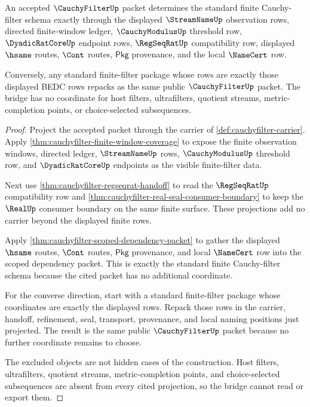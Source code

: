 \begin{theorem}
\label{thm:cauchyfilter-finite-filter-standard-bridge}
An accepted $\CauchyFilterUp$ packet determines the standard finite
Cauchy-filter schema exactly through the displayed $\StreamNameUp$ observation
rows, directed finite-window ledger, $\CauchyModulusUp$ threshold row,
$\DyadicRatCoreUp$ endpoint rows, $\RegSeqRatUp$ compatibility row, displayed
$\hsame$ routes, $\Cont$ routes, $\mathsf{Pkg}$ provenance, and the local
$\NameCert$ row.

Conversely, any standard finite-filter package whose rows are exactly those
displayed BEDC rows repacks as the same public $\CauchyFilterUp$ packet. The
bridge has no coordinate for host filters, ultrafilters, quotient streams,
metric-completion points, or choice-selected subsequences.
\end{theorem}
\begin{proof}
Project the accepted packet through the carrier of
\autoref{def:cauchyfilter-carrier}. Apply
\autoref{thm:cauchyfilter-finite-window-coverage} to expose the finite
observation windows, directed ledger, $\StreamNameUp$ rows,
$\CauchyModulusUp$ threshold row, and $\DyadicRatCoreUp$ endpoints as the
visible finite-filter data.

Next use \autoref{thm:cauchyfilter-regseqrat-handoff} to read the
$\RegSeqRatUp$ compatibility row and
\autoref{thm:cauchyfilter-real-seal-consumer-boundary} to keep the $\RealUp$
consumer boundary on the same finite surface. These projections add no carrier
beyond the displayed finite rows.

Apply \autoref{thm:cauchyfilter-scoped-dependency-packet} to gather the
displayed $\hsame$ routes, $\Cont$ routes, $\mathsf{Pkg}$ provenance, and local
$\NameCert$ row into the scoped dependency packet. This is exactly the standard
finite Cauchy-filter schema because the cited packet has no additional
coordinate.

For the converse direction, start with a standard finite-filter package whose
coordinates are exactly the displayed rows. Repack those rows in the carrier,
handoff, refinement, seal, transport, provenance, and local naming positions
just projected. The result is the same public $\CauchyFilterUp$ packet because
no further coordinate remains to choose.

The excluded objects are not hidden cases of the construction. Host filters,
ultrafilters, quotient streams, metric-completion points, and choice-selected
subsequences are absent from every cited projection, so the bridge cannot read
or export them.
\end{proof}

